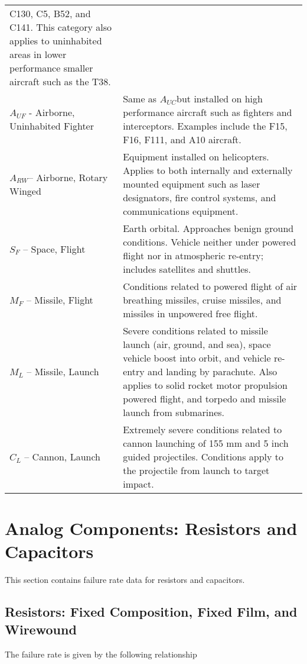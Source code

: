 \begin{table}
\begin{tabular}{|l|m{10cm}|}
C130, C5, B52, and C141. This category also applies to uninhabited areas
in lower performance smaller aircraft such as the T38. \\
$A_{UF}$ - Airborne, Uninhabited Fighter & Same as
$A_{UC}$but installed on high performance aircraft such as
fighters and interceptors. Examples include the F15, F16, F111, and A10
aircraft. \\
$A_{RW}$-- Airborne, Rotary Winged & Equipment installed on
helicopters. Applies to both internally and externally mounted equipment
such as laser designators, fire control systems, and communications
equipment. \\
$S_{F}$ -- Space, Flight & Earth orbital. Approaches benign
ground conditions. Vehicle neither under powered flight nor in
atmospheric re-entry; includes satellites and shuttles. \\
$M_{F}$ -- Missile, Flight & Conditions related to powered
flight of air breathing missiles, cruise missiles, and missiles in
unpowered free flight. \\
$M_{L}$ -- Missile, Launch & Severe conditions related to
missile launch (air, ground, and sea), space vehicle boost into orbit,
and vehicle re-entry and landing by parachute. Also applies to solid
rocket motor propulsion powered flight, and torpedo and missile launch
from submarines. \\
$C_{L}$ -- Cannon, Launch & Extremely severe conditions
related to cannon launching of 155 mm and 5 inch guided projectiles.
Conditions apply to the projectile from launch to target impact. \\
\end{tabular}
\end{table}

\section{Analog Components: Resistors and Capacitors}
\label{section:analog-components-resistors-and-capacitors}

This section contains failure rate data for resistors and capacitors.

\subsection{Resistors: Fixed Composition, Fixed Film, and Wirewound}
\label{section:resistors-fixed-composition-fixed-film-and-wirewound}

The failure rate is given by the following relationship

